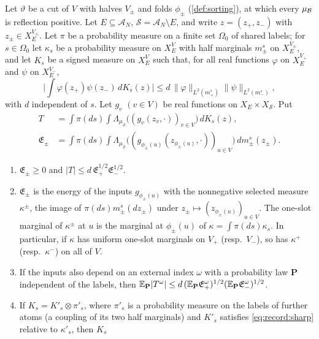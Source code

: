 \begin{lemma}\label{lem:record:folded-energy}
Let $\vartheta$ be a cut of $V$ with halves $V_\pm$ and folds $\phi_\pm$
(\cref{def:sorting}), at which every $\mu_\mathcal B$ is reflection positive. Let
$E\subseteq\mathcal A_N$, $\mathcal S=\mathcal A_N\setminus E$, and write
$z=(z_+,z_-)$ with $z_\pm\in X_E^{V_\pm}$. Let $\pi$ be a probability measure
on a finite set $\Omega_0$ of shared labels; for $s\in\Omega_0$ let
$\kappa_s$ be a probability measure on $X_E^V$ with half marginals $m_\pm^s$
on $X_E^{V_\pm}$, and let $K_s$ be a signed measure on $X_E^V$ such that,
for all real functions $\varphi$ on $X_E^{V_+}$ and $\psi$ on $X_E^{V_-}$,
\begin{equation}\label{eq:record:sharp}
 \Big|\int\varphi(z_+)\psi(z_-)\,dK_s(z)\Big|\le d\,
 \|\varphi\|_{L^2(m_+^s)}\|\psi\|_{L^2(m_-^s)},
\end{equation}
with $d$ independent of $s$. Let $g_v$ $(v\in V)$ be real functions on
$X_E\times X_{\mathcal S}$. Put
\begin{align*}
 T&=\int\pi(ds)\int\Lambda_{\mu_{\mathcal S}}\big((g_v(z_v,\cdot))_{v\in V}\big)\,dK_s(z),\\
 \mathfrak E_\pm&=\int\pi(ds)\int\Lambda_{\mu_{\mathcal S}}
 \big((g_{\phi_\pm(u)}(z_{\phi_\pm(u)},\cdot))_{u\in V}\big)\,dm_\pm^s(z_\pm).
\end{align*}
\begin{enumerate}[label=(\alph*)]
\item $\mathfrak E_\pm\ge0$ and $|T|\le d\,\mathfrak E_+^{1/2}\mathfrak E_-^{1/2}$.
\item $\mathfrak E_\pm$ is the energy of the inputs $g_{\phi_\pm(u)}$ with the
 nonnegative selected measure $\kappa^\pm$, the image of
 $\pi(ds)m_\pm^s(dz_\pm)$ under $z_\pm\mapsto(z_{\phi_\pm(u)})_{u\in V}$. The
 one-slot marginal of $\kappa^\pm$ at $u$ is the marginal at $\phi_\pm(u)$
 of $\kappa=\int\pi(ds)\kappa_s$. In particular, if $\kappa$ has uniform
 one-slot marginals on $V_+$ (resp.\ $V_-$), so has $\kappa^+$
 (resp.\ $\kappa^-$) on all of $V$.
\item If the inputs also depend on an external index $\omega$ with a
 probability law $\mathbf P$ independent of the labels, then
 $\mathbb E_{\mathbf P}|T^\omega|\le d\,(\mathbb E_{\mathbf P}\mathfrak E_+^\omega)^{1/2}
 (\mathbb E_{\mathbf P}\mathfrak E_-^\omega)^{1/2}$.
\item If $K_s=K'_s\otimes\pi'_s$, where $\pi'_s$ is a probability measure on
 the labels of further atoms (a coupling of its two half marginals) and
 $K'_s$ satisfies \eqref{eq:record:sharp} relative to $\kappa'_s$, then $K_s$

\end{enumerate}
\end{lemma}
